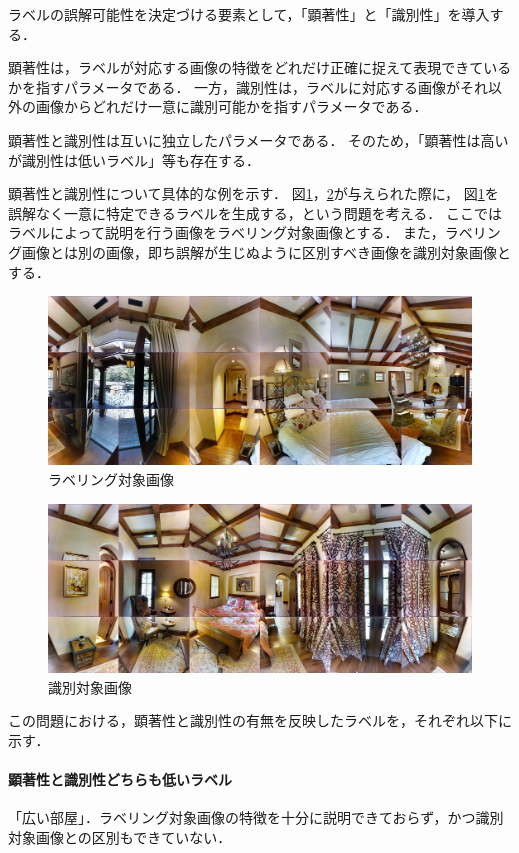 \documentclass[a4paper,11pt]{jreport}
\begin{document}
ラベルの誤解可能性を決定づける要素として，「顕著性」と「識別性」を導入する．

顕著性は，ラベルが対応する画像の特徴をどれだけ正確に捉えて表現できているかを指すパラメータである．
一方，識別性は，ラベルに対応する画像がそれ以外の画像からどれだけ一意に識別可能かを指すパラメータである．

顕著性と識別性は互いに独立したパラメータである．
そのため，「顕著性は高いが識別性は低いラベル」等も存在する．

顕著性と識別性について具体的な例を示す．
図\ref{fig:white_bed}，\ref*{fig:pink_bed}が与えられた際に，
図\ref{fig:white_bed}を誤解なく一意に特定できるラベルを生成する，という問題を考える．
ここではラベルによって説明を行う画像をラベリング対象画像とする．
また，ラベリング画像とは別の画像，即ち誤解が生じぬように区別すべき画像を識別対象画像とする．

\begin{figure}[H]
	\centering
	\includegraphics[width=0.8\linewidth]{figures/3-2_white_bed.jpg}
	\caption{ラベリング対象画像}
	\label{fig:white_bed}
\end{figure}

\begin{figure}[H]
	\centering
	\includegraphics[width=0.8\linewidth]{figures/3-2_pink_bed.jpg}
	\caption{識別対象画像}
	\label{fig:pink_bed}
\end{figure}

この問題における，顕著性と識別性の有無を反映したラベルを，それぞれ以下に示す．

\paragraph*{顕著性と識別性どちらも低いラベル}
「広い部屋」．ラベリング対象画像の特徴を十分に説明できておらず，かつ識別対象画像との区別もできていない．
\end{document}
